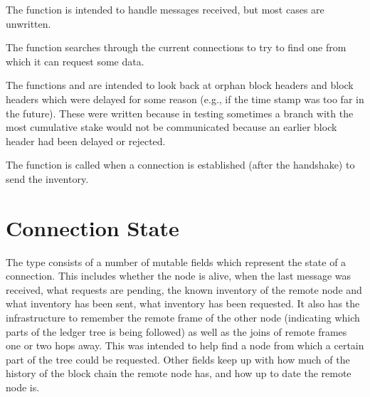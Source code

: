 The function {} is intended to handle messages received,
but most cases are unwritten.

The function {} searches through the current connections
to try to find one from which it can request some data.

The functions {} and {}
are intended to look back at orphan block headers and block headers which
were delayed for some reason (e.g., if the time stamp was too far in the future).
These were written because in testing sometimes a branch with the most cumulative stake
would not be communicated because an earlier block header had been delayed or rejected.


The function {} is called when a connection is established (after the handshake)
to send the inventory.

\section{Connection State}

The type {} consists of a number of mutable fields
which represent the state of a connection.
This includes whether the node is alive,
when the last message was received,
what requests are pending,
the known inventory of the remote node
and what inventory has been sent, what inventory has been requested.
It also has the infrastructure to remember the remote frame of the other node
(indicating which parts of the ledger tree is being followed)
as well as the joins of remote frames one or two hops away. This was
intended to help find a node from which a certain part of the tree could be requested.
Other fields keep up with how much of the history of the block chain the remote node
has, and how up to date the remote node is.






